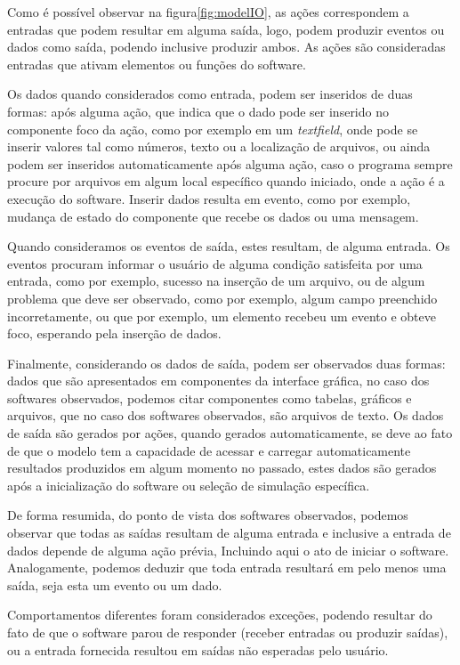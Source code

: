 \documentclass[tg]{mdtufsm}
\begin{document}
                Como é possível observar na figura\ref{fig:modelIO}, as ações correspondem a entradas que podem resultar em alguma saída, logo, podem produzir eventos ou dados como saída, podendo inclusive produzir ambos. As ações são consideradas entradas que ativam elementos ou funções do software.

                Os dados quando considerados como entrada, podem ser inseridos de duas formas: após alguma ação, que indica que o dado pode ser inserido no componente foco da ação, como por exemplo em um \emph{textfield}, onde pode se inserir valores tal como números, texto ou a localização de arquivos, ou ainda podem ser inseridos automaticamente após alguma ação, caso o programa sempre procure por arquivos em algum local específico quando iniciado, onde a ação é a execução do software. Inserir dados resulta em  evento, como por exemplo, mudança de estado do componente que recebe os dados ou uma mensagem.

                Quando consideramos os eventos de saída, estes resultam, de alguma entrada. Os eventos procuram informar o usuário de alguma condição satisfeita por uma entrada, como por exemplo, sucesso na inserção de um arquivo, ou de algum problema que deve ser observado, como por exemplo, algum campo preenchido incorretamente, ou que por exemplo, um elemento recebeu um evento e obteve foco, esperando pela inserção de dados.

                Finalmente, considerando os dados de saída, podem ser observados duas formas: dados que são apresentados em componentes da interface gráfica, no caso dos softwares observados, podemos citar componentes como tabelas, gráficos e arquivos, que no caso dos softwares observados, são arquivos de texto. Os dados de saída são gerados por ações, quando gerados automaticamente, se deve ao fato de que o modelo tem a capacidade de acessar e carregar automaticamente resultados produzidos em algum momento no passado, estes dados são gerados após a inicialização do software ou seleção de simulação específica.

                De forma resumida, do ponto de vista dos softwares observados, podemos observar que todas as saídas resultam de alguma entrada e inclusive a entrada de dados depende de alguma ação prévia, Incluindo aqui o ato de iniciar o software. Analogamente, podemos deduzir que toda entrada resultará em pelo menos uma saída, seja esta um evento ou um dado.

                Comportamentos diferentes foram considerados exceções, podendo resultar do fato de que o software parou de responder (receber entradas ou produzir saídas), ou a entrada fornecida resultou em saídas não esperadas pelo usuário.
\end{document}
